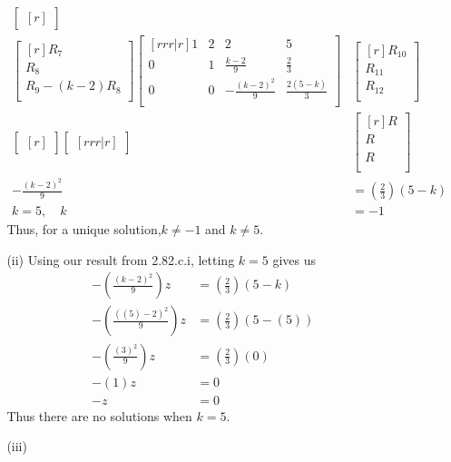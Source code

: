 \documentclass[12pt]{article}
\begin{document}
\begin{enumerate}
\begin{enumerate}
\begin{enumerate}
\begin{align*}
\begin{bmatrix}[r]
		\end{bmatrix}\\
		\begin{bmatrix}[r]
		R_7\\
		R_8\\
		R_9 - (k-2)R_8\\
		\end{bmatrix}
		\begin{bmatrix}[rrr|r]
		1 & 2 & 2 & 5\\
		0 & 1 & \frac{k-2}{9} & \frac{2}{3}\\
		0 & 0 & -\frac{(k-2)^2}{9} & \frac{2(5-k)}{3}\\
		\end{bmatrix}&
		\begin{bmatrix}[r]
		R_{10}\\ R_{11}\\ R_{12}\\
		\end{bmatrix}\\
		\begin{bmatrix}[r]
		\end{bmatrix}
		\begin{bmatrix}[rrr|r]
		\end{bmatrix}&
		\begin{bmatrix}[r]
		R_{}\\ R_{}\\ R_{}\\
		\end{bmatrix}\\
		-\frac{(k-2)^2}{9} &= (\frac{2}{3})(5-k)\\
		
		k = 5, \quad k &= -1
		\end{align*}
		Thus, for a unique solution,$k \neq -1$ and $k \neq 5$. 
		\item [(ii)]
		Using our result from 2.82.c.i, letting $k = 5$ gives us
		\begin{align*}
		-(\frac{(k-2)^2}{9})z &= (\frac{2}{3})(5-k)\\
		-(\frac{((5)-2)^2}{9})z &= (\frac{2}{3})(5-(5))\\
		-(\frac{(3)^2}{9})z &= (\frac{2}{3})(0)\\
		-(1)z &= 0\\
		-z &= 0
		\end{align*}
		Thus there are no solutions when $k = 5$.
		
		\item [(iii)]
		

\end{enumerate}
\end{enumerate}
\end{enumerate}
\end{document}
